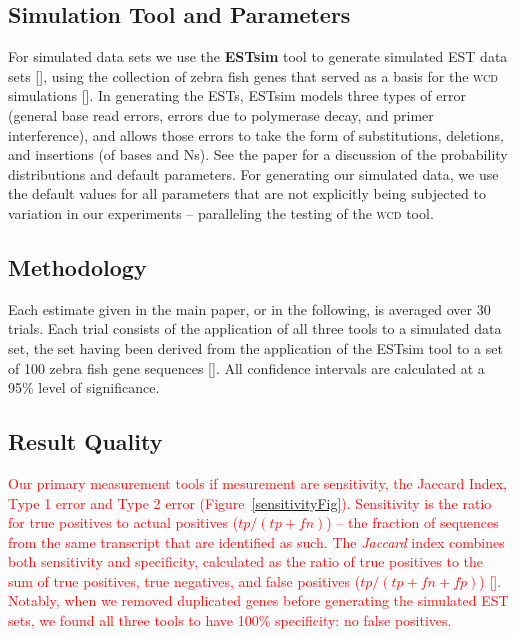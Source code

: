 \documentclass[a4paper,12pt]{article}
\newcommand{\mc}[1]{\textcolor{red}{#1}}
\begin{document}
\begin{appendix}
\subsection{Simulation Tool and Parameters}

For simulated data sets we use the {\bf ESTsim} tool to generate
simulated EST data sets [\cite{Hazelhurst03}], using the collection of
zebra fish genes that served as a basis for the \textsc{wcd} simulations
[\cite{Hazelhurst08a}].  In generating the ESTs, ESTsim models three
types of error (general base read errors, errors due to
polymerase decay, and primer interference), and allows those errors to
take the form of substitutions, deletions, and insertions (of bases
and Ns).  See the paper for a discussion of the probability
distributions and default parameters.  For generating our simulated
data, we use the default values for all parameters that are not
explicitly being subjected to variation in our experiments --
paralleling the testing of the \textsc{wcd} tool.



\subsection{Methodology} 

Each estimate given in the main paper, or in the following, is
averaged over 30 trials.  Each trial consists of the application of
all three tools to a simulated data set, the set having been derived
from the application of the ESTsim tool to a set of 100 zebra fish
gene sequences [\cite{Hazelhurst03}].  All confidence intervals are
calculated at a 95\% level of significance.

\subsection{Result Quality}

\mc{Our primary measurement tools if mesurement are sensitivity, the
Jaccard Index, Type 1 error and Type 2 error
(Figure~\ref{sensitivityFig}).  Sensitivity is the ratio for true
positives to actual positives ($tp / (tp + fn)$) -- the fraction of
sequences from the same transcript that are identified as such.  The
{\it Jaccard} index combines both sensitivity and specificity,
calculated as the ratio of true positives to the sum of true
positives, true negatives, and false positives ($tp / (tp+fn+fp)$)
[\cite{Hazelhurst08a}].  Notably, when we removed duplicated genes
before generating the simulated EST sets, we found all three tools to
have 100\% specificity: no false positives.}


\end{appendix}
\end{document}
